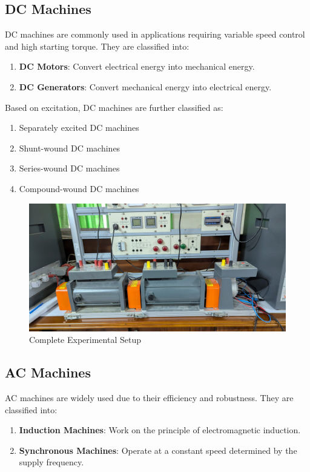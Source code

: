 \documentclass[a4paper,12pt]{article}
\begin{document}
	\subsection{DC Machines}
	DC machines are commonly used in applications requiring variable speed control and high starting torque. They are classified into:
	\begin{enumerate}
		\item \textbf{DC Motors}: Convert electrical energy into mechanical energy.
		\item \textbf{DC Generators}: Convert mechanical energy into electrical energy.
	\end{enumerate}
	Based on excitation, DC machines are further classified as:
	\begin{enumerate}
		\item Separately excited DC machines
		\item Shunt-wound DC machines
		\item Series-wound DC machines
		\item Compound-wound DC machines
	\end{enumerate}
	\newpage
	
	\begin{figure}[H]
		\centering
		\includegraphics[width=.7\linewidth, height=0.2\textheight]{"Images/5"}
		\caption{Complete Experimental Setup}
	\end{figure}
	
	\subsection{AC Machines}
	AC machines are widely used due to their efficiency and robustness. They are classified into:
	\begin{enumerate}
		\item \textbf{Induction Machines}: Work on the principle of electromagnetic induction.
		\item \textbf{Synchronous Machines}: Operate at a constant speed determined by the supply frequency.
	
	\end{enumerate}
	
\end{document}

